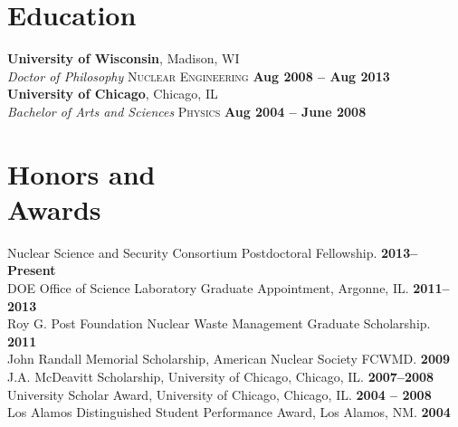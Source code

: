 \documentclass[margin,line]{resume}
\begin{document}
\begin{resume}
    \vspace{-3mm}
    \section{\mysidestyle Education}
    \textbf{University of Wisconsin}, Madison, WI \\%
        \textsl{Doctor of Philosophy} \textsc{Nuclear Engineering}\hfill \textbf{ Aug 2008 -- Aug 2013}\vspace{1mm}\\%
    \textbf{University of Chicago}, Chicago, IL \\%
	\textsl{Bachelor of Arts and Sciences}\textsc{ Physics} \hfill \textbf{Aug 2004 -- June 2008}%
    \vspace{-3mm}
    \section{\mysidestyle Honors and\\Awards} 
                Nuclear Science and Security Consortium Postdoctoral Fellowship.   \hfill \textbf{2013--Present}\vspace{.5mm}\\%
		DOE Office of Science Laboratory Graduate Appointment, Argonne, IL.   \hfill \textbf{2011--2013}\vspace{.5mm}\\%
		Roy G. Post Foundation Nuclear Waste Management Graduate Scholarship.       \hfill \textbf{2011}\vspace{.5mm}\\%
		John Randall Memorial Scholarship, American Nuclear Society FCWMD.          \hfill \textbf{2009}\vspace{.5mm}\\%
		J.A. McDeavitt Scholarship, University of Chicago, Chicago, IL.        \hfill\textbf{2007--2008}\vspace{.5mm}\\%
		University Scholar Award, University of Chicago, Chicago, IL.        \hfill\textbf{2004 -- 2008}\vspace{.5mm}\\%
		Los Alamos Distinguished Student Performance Award, Los Alamos, NM.          \hfill\textbf{2004}%
    \vspace{-3mm}

\end{resume}
\end{document}
